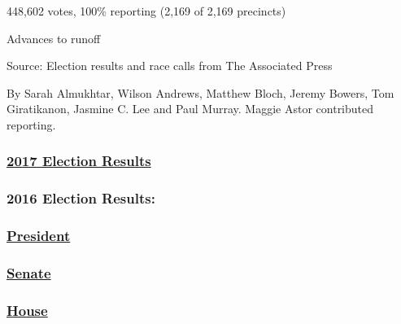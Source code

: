 448,602 votes, 100\% reporting (2,169 of 2,169 precincts)

 Advances to runoff

Source: Election results and race calls from The Associated Press

By Sarah Almukhtar, Wilson Andrews, Matthew Bloch, Jeremy Bowers, Tom
Giratikanon, Jasmine C. Lee and Paul Murray. Maggie Astor contributed
reporting.

\hypertarget{2017-election-results}{%
\subsubsection{\texorpdfstring{\href{https://www.nytimes3xbfgragh.onion/interactive/2017/us/elections/election-calendar.html}{2017
Election Results}}{2017 Election Results}}\label{2017-election-results}}

\hypertarget{2016-election-results}{%
\subsubsection{2016 Election Results:}\label{2016-election-results}}

\hypertarget{president}{%
\subsubsection{\texorpdfstring{\href{https://www.nytimes3xbfgragh.onion/elections/results/president}{President}}{President}}\label{president}}

\hypertarget{senate}{%
\subsubsection{\texorpdfstring{\href{https://www.nytimes3xbfgragh.onion/elections/results/senate}{Senate}}{Senate}}\label{senate}}

\hypertarget{house}{%
\subsubsection{\texorpdfstring{\href{https://www.nytimes3xbfgragh.onion/elections/results/house}{House}}{House}}\label{house}}


